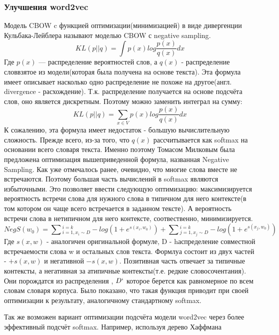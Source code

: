 \subsubsection{Улучшения word2vec}
Модель CBOW c функцией оптимизации(минимизацией) в виде  дивергенции Кульбака-Лейблера называют моделью CBOW с negative sampling\cite{Book29}.
\begin{equation}
KL(p||q) = \int p(x)log\frac{p(x)}{q(x)}dx
\end{equation}
Где $p(x)$  — распределение вероятностей слов, а $q(x)$ - распределение словвзятое из модели(которая была получена на основе текста). Эта формула имеет описывает насколько одно распределение не похоже на другое(англ. divergence  - расхождение). Т.к. распределение получается на основе подсчёта слов, оно является дискретным. Поэтому  можно заменить интеграл на сумму:
\begin{equation}
KL(p||q) = \sum_{x \in V} p(x)log\frac{p(x)}{q(x)}dx
\end{equation}
К сожалению, эта формула имеет недостаток - большую вычислительную сложность. Прежде всего, из-за того, что $q(x)$ рассчитывается как softmax на основании всего словаря текста.
Именно поэтому Томасом Милковым\cite{Book29} была предложена оптимизация вышеприведенной формула, названная Negative Sampling. Как уже отмечалось ранее, очевидно, что многие слова вместе не встречаются. Поэтому большая часть вычислений в softmax являются избыточными. Это позволяет ввести следующую оптимизацию: максимизируется вероятность встречи слова для нужного слова в типичном для него контексте(в том котором он чаще всего встречается в заданном тексте). А вероятность встречи слова в нетипичном для него контексте, соотвественно, минимизируется.
\begin{equation}
NegS(w_0) = \sum{_{i=1, x_i \sim D}^{i=k} -log(1 + e^{s(x_i, w_0)})}  + 
\sum{_{j=1, x_j \sim D}^{i=k} -log(1 + e^{s(x_j, w_0)})}
\end{equation}
Где $s(x,w)$ - аналогичен оригинальной формуле,  D - hаспределение совместной встречаемости слова w и остальных слов текста. Формлуа состоит из двух частей - $+s(x,w)$ и негативной $-s(x,w)$. Позитивная часть отвечает за типичные контексты, а негативная за атипичные контексты(т.е. редкие словосочентания).
Они порождатся из распределения , $D`$ которое берется как равномерное по всем словам словаря корпуса. Было показано, что такая функция приводит при своей оптимизации к результату, аналогичному стандартному softmax\cite{Book29}.


Так же возможен вариант  оптимизации подсчёта модели word2vec через более эффективный подсчёт softmax. Например, используя дерево Хаффмана\cite{Book30}

